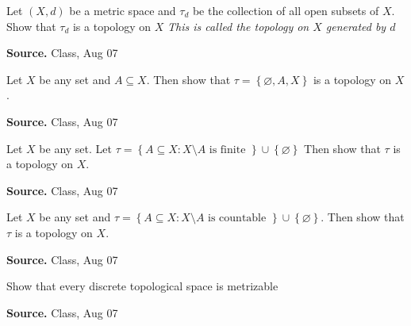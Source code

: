 \documentclass[12pt,twoside]{report}
\newenvironment*{source}{\hfill\scriptsize\textbf{Source.}\space}{\par}
\begin{document}
\begin{samepage}
\begin{ex}
Let $\left (X, d\right )$ be a metric space and $\tau_d$ be the collection of all open subsets of $X$. 
Show that $\tau_d$ is a topology on $X$
\vspace{0.5cm}
\textit{This is called the topology on $X$ generated by $d$}
\end{ex}
\begin{source}
Class, Aug 07
\end{source}
\end{samepage}

\begin{samepage}
\begin{ex}
Let $X$ be any set and $A \subseteq X$. Then show that 
$\tau = \left\{ \varnothing, A , X \right\}$ is a topology on $X$.
\end{ex}
\begin{source}
Class, Aug 07
\end{source}
\end{samepage}

\begin{samepage}
\begin{ex}
Let $X$ be any set. Let 
$\tau = \left\{ A \subseteq X  :  X \setminus A \text{ is finite } \right\} \cup \left\{ \varnothing \right\} $
Then show that $\tau$ is a topology on $X$.
\end{ex}
\begin{source}
Class, Aug 07
\end{source}
\end{samepage}

\begin{samepage}
\begin{ex}
Let $X$ be any set and 
$\tau = \left\{ A \subseteq X  :  X \setminus A \text{ is countable } \right\} \cup \left\{ \varnothing \right\} $.
Then show that $\tau$ is a topology on $X$.
\end{ex}
\begin{source}
Class, Aug 07
\end{source}
\end{samepage}

\begin{samepage}
\begin{ex}
Show that every discrete topological space is metrizable
\end{ex}
\begin{source}
Class, Aug 07
\end{source}
\end{samepage}
\end{document}
